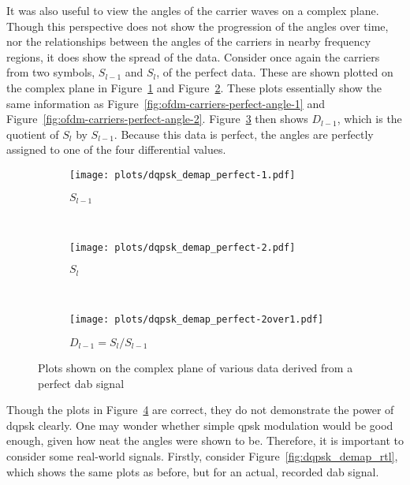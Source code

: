 \documentclass[class=report,11pt,crop=false]{standalone}
\begin{document}
It was also useful to view the angles of the carrier waves on a complex plane. Though this perspective does not show the progression of the angles over time, nor the relationships between the angles of the carriers in nearby frequency regions, it does show the spread of the data. Consider once again the carriers from two symbols, \(S_{l-1}\) and \(S_{l}\), of the perfect data. These are shown plotted on the complex plane in Figure~\ref{fig:dqpsk_demap_perfect-1} and Figure~\ref{fig:dqpsk_demap_perfect-2}. These plots essentially show the same information as Figure~\ref{fig:ofdm-carriers-perfect-angle-1} and Figure~\ref{fig:ofdm-carriers-perfect-angle-2}. Figure~\ref{fig:dqpsk_demap_perfect-2over1} then shows \(D_{l-1}\), which is the quotient of \(S_{l}\) by \(S_{l-1}\). Because this data is perfect, the angles are perfectly assigned to one of the four differential values.

\begin{figure}[htbp]
  \centering
  \captionsetup{type=figure}
  \begin{subfigure}[t]{0.3\textwidth}
    \centering
    \captionsetup{type=figure}
    \texttt{[image: plots/dqpsk\_demap\_perfect-1.pdf]}
    \caption{\(S_{l-1}\)}
    \label{fig:dqpsk_demap_perfect-1}
  \end{subfigure}%
  ~ 
  \begin{subfigure}[t]{0.3\textwidth}
    \centering
    \captionsetup{type=figure}
    \texttt{[image: plots/dqpsk\_demap\_perfect-2.pdf]}
    \caption{\(S_{l}\)}
    \label{fig:dqpsk_demap_perfect-2}
  \end{subfigure}
  ~ 
  \begin{subfigure}[t]{0.3\textwidth}
    \centering
    \captionsetup{type=figure}
    \texttt{[image: plots/dqpsk\_demap\_perfect-2over1.pdf]}
    \caption{\(D_{l-1} = S_{l}/S_{l-1}\)}
    \label{fig:dqpsk_demap_perfect-2over1}
  \end{subfigure}
  \caption{Plots shown on the complex plane of various data derived from a perfect \gls{dab} signal}
  \label{fig:dqpsk_demap_perfect}
\end{figure}

Though the plots in Figure~\ref{fig:dqpsk_demap_perfect} are correct, they do not demonstrate the power of \gls{dqpsk} clearly. One may wonder whether simple \gls{qpsk} modulation would be good enough, given how neat the angles were shown to be. Therefore, it is important to consider some real-world signals. Firstly, consider Figure~\ref{fig:dqpsk_demap_rtl}, which shows the same plots as before, but for an actual, recorded \gls{dab} signal.
\end{document}
